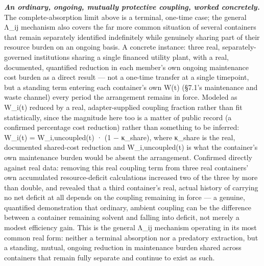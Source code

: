 \documentclass[
]{article}
\begin{document}
\emph{\textbf{An ordinary, ongoing, mutually protective coupling, worked
concretely.}} The complete-absorption limit above is a terminal,
one-time case; the general Λ\_ij mechanism also covers the far more
common situation of several containers that remain separately identified
indefinitely while genuinely sharing part of their resource burden on an
ongoing basis. A concrete instance: three real, separately-governed
institutions sharing a single financed utility plant, with a real,
documented, quantified reduction in each member's own ongoing
maintenance cost burden as a direct result --- not a one-time transfer
at a single timepoint, but a standing term entering each container's own
W(t) (§7.1's maintenance and waste channel) every period the arrangement
remains in force. Modeled as W\_i(t) reduced by a real, adapter-supplied
coupling fraction rather than fit statistically, since the magnitude
here too is a matter of public record (a confirmed percentage cost
reduction) rather than something to be inferred: W\_i(t) =
W\_i,uncoupled(t) · (1 − κ\_share), where κ\_share is the real,
documented shared-cost reduction and W\_i,uncoupled(t) is what the
container's own maintenance burden would be absent the arrangement.
Confirmed directly against real data: removing this real coupling term
from three real containers' own accumulated resource-deficit
calculations increased two of the three by more than double, and
revealed that a third container's real, actual history of carrying no
net deficit at all depends on the coupling remaining in force --- a
genuine, quantified demonstration that ordinary, ambient coupling can be
the difference between a container remaining solvent and falling into
deficit, not merely a modest efficiency gain. This is the general Λ\_ij
mechanism operating in its most common real form: neither a terminal
absorption nor a predatory extraction, but a standing, mutual, ongoing
reduction in maintenance burden shared across containers that remain
fully separate and continue to exist as such.
\end{document}

